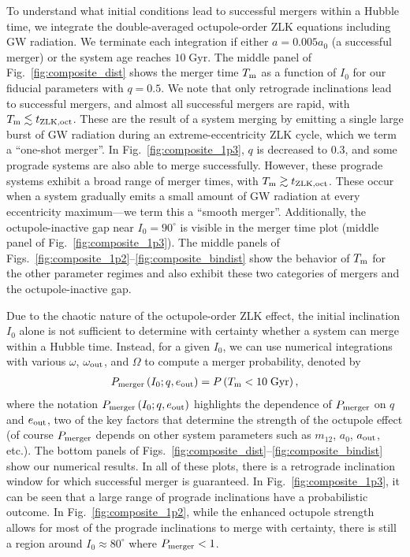 \documentclass[
        fleqn,
        usenatbib,
    ]{mnras}
\newcommand*{\p}[1]{\left(#1\right)}
\begin{document}
To understand what initial conditions lead to successful mergers within a Hubble
time, we integrate the double-averaged octupole-order ZLK equations including GW
radiation. We terminate each integration if either $a = 0.005a_0$ (a successful
merger) or the system age reaches $10\;\mathrm{Gyr}$. The middle panel of
Fig.~\ref{fig:composite_dist} shows the merger time $T_{\rm m}$ as a function of
$I_0$ for our fiducial parameters with $q = 0.5$. We note that only retrograde
inclinations lead to successful mergers, and almost all successful mergers are
rapid, with $T_{\rm m} \lesssim t_{\rm ZLK, oct}$. These are the result of a
system merging by emitting a single large burst of GW radiation during an
extreme-eccentricity ZLK cycle, which we term a ``one-shot merger''. In
Fig.~\ref{fig:composite_1p3}, $q$ is decreased to $0.3$, and some prograde
systems are also able to merge successfully. However, these prograde systems
exhibit a broad range of merger times, with $T_{\rm m} \gtrsim t_{\rm ZLK,
oct}$. These occur when a system gradually emits a small amount of GW radiation
at every eccentricity maximum---we term this a ``smooth merger''. Additionally,
the octupole-inactive gap near $I_0 = 90^\circ$ is visible in the merger time
plot (middle panel of Fig.~\ref{fig:composite_1p3}). The middle panels of
Figs.~\ref{fig:composite_1p2}--\ref{fig:composite_bindist} show the behavior of
$T_{\rm m}$ for the other parameter regimes and also exhibit these two
categories of mergers and the octupole-inactive gap.

Due to the chaotic nature of the octupole-order ZLK effect, the initial
inclination $I_0$ alone is not sufficient to determine with certainty whether a
system can merge within a Hubble time. Instead, for a given $I_0$, we can use
numerical integrations with various $\omega$, $\omega_{\rm out}$, and $\Omega$
to compute a merger probability, denoted by
\begin{align}
    P_{\rm merger}\p{I_0; q, e_{\rm out}} = P\p{T_{\rm m} < 10\;\mathrm{Gyr}},
        \label{eq:def_pmerge}
\end{align}
where the notation $P_{\rm merger}\p{I_0; q, e_{\rm out}}$ highlights the
dependence of $P_{\rm merger}$ on $q$ and $e_{\rm out}$, two of the key factors
that determine the strength of the octupole effect (of course $P_{\rm merger}$
depends on other system parameters such as $m_12$, $a_0$, $a_{\rm out}$, etc.).
The bottom panels of Figs.~\ref{fig:composite_dist}--\ref{fig:composite_bindist}
show our numerical results. In all of these plots, there is a retrograde
inclination window for which successful merger is guaranteed. In
Fig.~\ref{fig:composite_1p3}, it can be seen that a large range of prograde
inclinations have a probabilistic outcome. In Fig.~\ref{fig:composite_1p2},
while the enhanced octupole strength allows for most of the prograde
inclinations to merge with certainty, there is still a region around $I_0
\approx 80^\circ$ where $P_{\rm merger} < 1$.
\end{document}
